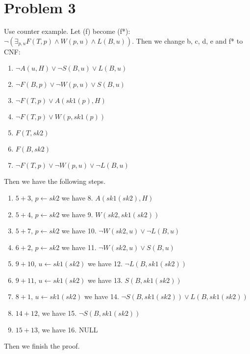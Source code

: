 \documentclass[11pt]{article}
\begin{document}
	\section*{Problem 3}
	Use counter example. Let (f) become (f*): $ \neg(\exists_{p,u} F(T,p)\wedge W(p,u)\wedge L(B,u)) $. Then we change b, c, d, e and f* to CNF:
	\begin{enumerate}[1.]
		\setcounter{enumi}{0} %
		\item $ \neg A(u,H)\vee \neg S(B,u)\vee L(B,u) $
		\item $ \neg F(B,p)\vee \neg W(p,u)\vee S(B,u) $
		\item $ \neg F(T,p)\vee A(sk1(p),H) $
		\item $ \neg F(T,p)\vee W(p,sk1(p)) $
		\item $ F(T,sk2) $ 
		\item $ F(B,sk2) $
		\item $ \neg F(T,p)\vee\neg W(p,u)\vee\neg L(B,u) $
	\end{enumerate}
	Then we have the following steps.
	\begin{enumerate}
		\item $ 5+3 $, $ p\leftarrow sk2 $ we have 8. $ A(sk1(sk2),H) $
		\item $ 5+4 $, $ p\leftarrow sk2 $ we have 9. $ W(sk2,sk1(sk2)) $
		\item $ 5+7 $, $ p\leftarrow sk2 $ we have 10. $ \neg W(sk2,u)\vee \neg L(B,u) $
		\item $ 6+2 $, $ p\leftarrow sk2 $ we have 11. $ \neg W(sk2,u)\vee S(B,u) $
		\item $ 9+10 $, $ u\leftarrow sk1(sk2) $ we have 12. $ \neg L(B,sk1(sk2)) $
		\item $ 9+11 $, $ u\leftarrow sk1(sk2) $ we have 13. $ S(B,sk1(sk2)) $
		\item $ 8+1 $, $ u\leftarrow sk1(sk2) $ we have 14. $ \neg S(B,sk1(sk2))\vee L(B,sk1(sk2)) $
		\item $ 14+12 $, we have 15. $ \neg S(B,sk1(sk2)) $
		\item $ 15+13 $, we have 16. NULL
	\end{enumerate}
	Then we finish the proof.
\end{document}

